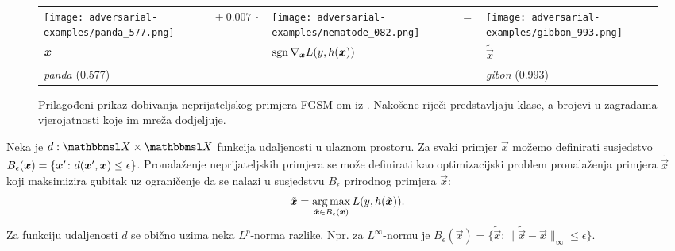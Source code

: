 \documentclass[utf8, diplomski, lmodern]{fer}
\begin{document}
\begin{figure}
	\centering
	\begin{tabular}{>{\centering\arraybackslash}m{}m{.5in}>{\centering\arraybackslash}m{}m{.1in}>{\centering\arraybackslash}m{}}
		\centering\arraybackslash
		\texttt{[image: adversarial-examples/panda\_577.png]} &%
		\centering\arraybackslash%
		$ +\ 0.007\ \cdot$ &%
		\texttt{[image: adversarial-examples/nematode\_082.png]} &%
		$=$ & %
		\texttt{[image: adversarial-examples/gibbon\_993.png]} \\
		$\centering \vec x$     &%
		& $\sgn \nabla_{\vec x} L(y,h(\vec x))$ & & $\tilde{\vec x}$ \\
		\emph{panda} (0.577) & & & & \emph{gibon} (0.993) 
	\end{tabular}
	\caption{Prilagođeni prikaz dobivanja neprijateljskog primjera FGSM-om iz \cite{Goodfellow:2014:EHAE}. Nakošene riječi predstavljaju klase, a brojevi u zagradama vjerojatnosti koje im mreža dodjeljuje.}
	\label{fig:neprijateljski-primjer}
\end{figure}

Neka je $d:\set{X}\times\set{X}$ funkcija udaljenosti u ulaznom prostoru. Za svaki primjer $\vec x$ možemo definirati susjedstvo $B_\epsilon(\vec x) = \cbr{\vec x' \colon d(\vec x',\vec x)\leq\epsilon}$. Pronalaženje neprijateljskih primjera se može definirati kao optimizacijski problem pronalaženja primjera $\tilde{\vec x}$ koji maksimizira gubitak uz ograničenje da se nalazi u susjedstvu $B_\epsilon$ prirodnog primjera $\vec x$:
\begin{equation} \label{eq:neprijateljski-primjer}
\tilde{\vec x} = \argmax_{\tilde{\vec x}\in B_\epsilon(\vec x)} L(y,h(\tilde{\vec x})) \text{.}
\end{equation}
Za funkciju udaljenosti $d$ se obično uzima neka $L^p$-norma razlike. Npr. za $L^\infty$-normu je $B_\epsilon(\vec x) = \{\tilde{\vec x} : \lVert \tilde{\vec x}-\vec x\rVert_\infty\leq\epsilon\}$.
\end{document}
